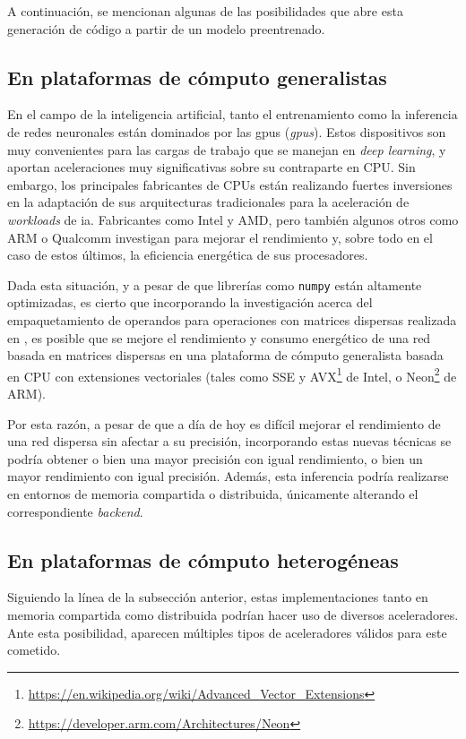 A continuación, se mencionan algunas de las posibilidades que abre esta generación de código a partir de un modelo preentrenado.

\subsection{En plataformas de cómputo generalistas}
\label{ssec:posibilidades_en_computo_generalistas}
En el campo de la inteligencia artificial, tanto el entrenamiento como la inferencia de redes neuronales están dominados por las \acrshort{gpu}s (\textit{\acrlong{gpu}s}). Estos dispositivos son muy convenientes para las cargas de trabajo que se manejan en \textit{deep learning}, y aportan aceleraciones muy significativas sobre su contraparte en CPU. Sin embargo, los principales fabricantes de CPUs están realizando fuertes inversiones en la adaptación de sus arquitecturas tradicionales para la aceleración de \textit{workloads} de \acrshort{ia}. Fabricantes como Intel y AMD, pero también algunos otros como ARM o Qualcomm investigan para mejorar el rendimiento y, sobre todo en el caso de estos últimos, la eficiencia energética de sus procesadores.

Dada esta situación, y a pesar de que librerías como \texttt{numpy} están altamente optimizadas, es cierto que incorporando la investigación acerca del empaquetamiento de operandos para operaciones con matrices dispersas realizada en \cite{custom_high_performance_vector_codegen_sparse_computations}, es posible que se mejore el rendimiento y consumo energético de una red basada en matrices dispersas en una plataforma de cómputo generalista basada en CPU con extensiones vectoriales (tales como SSE y AVX\footnote{\url{https://en.wikipedia.org/wiki/Advanced\_Vector\_Extensions}} de Intel, o Neon\footnote{\url{https://developer.arm.com/Architectures/Neon}} de ARM).

Por esta razón, a pesar de que a día de hoy es difícil mejorar el rendimiento de una red dispersa sin afectar a su precisión, incorporando estas nuevas técnicas se podría obtener o bien una mayor precisión con igual rendimiento, o bien un mayor rendimiento con igual precisión. Además, esta inferencia podría realizarse en entornos de memoria compartida o distribuida, únicamente alterando el correspondiente \textit{backend}.


\subsection{En plataformas de cómputo heterogéneas}
\label{ssec:posibilidades_en_computo_heterogeneas}
Siguiendo la línea de la subsección anterior, estas implementaciones tanto en memoria compartida como distribuida podrían hacer uso de diversos aceleradores. Ante esta posibilidad, aparecen múltiples tipos de aceleradores válidos para este cometido.

